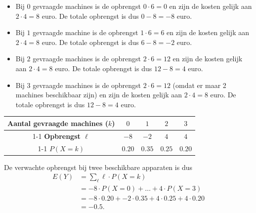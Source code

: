 \begin{enumerate}[label=(\alph*)]
{            \begin{itemize}
                \item Bij $0$ gevraagde machines is de opbrengst $0 \cdot 6=0$ en zijn de kosten gelijk aan $2 \cdot 4=8$ euro.
                De totale opbrengst is dus $0 - 8 = -8$ euro.
                \item Bij $1$ gevraagde machine is de opbrengst $1 \cdot 6=6$ en zijn de kosten gelijk aan $2 \cdot 4=8$ euro.
                De totale opbrengst is dus $6 - 8 = -2$ euro.
                \item Bij $2$ gevraagde machines is de opbrengst $2 \cdot 6=12$ en zijn de kosten gelijk aan $2 \cdot 4=8$ euro.
                De totale opbrengst is dus $12 - 8 = 4$ euro.
                \item Bij $3$ gevraagde machines is de opbrengst $2 \cdot 6=12$ (omdat er maar 2 machines beschikbaar zijn) en zijn de kosten gelijk aan $2 \cdot 4=8$ euro.
                De totale opbrengst is dus $12 - 8 = 4$ euro.
            \end{itemize}
            \begin{center}
                \begin{tabular}{ccccc}
                    \toprule
                        {\bfseries Aantal gevraagde machines ($k$)} & $0$ & $1$ & $2$ & $3$ \\        
                        \cmidrule{1-1} \cmidrule{2-2} \cmidrule{3-3} \cmidrule{4-4} \cmidrule{5-5}
                        {\bfseries Opbrengst $\ell$} & $-8$ & $-2$ & $4$ & $4$ \\        
                        \cmidrule{1-1} \cmidrule{2-2} \cmidrule{3-3} \cmidrule{4-4} \cmidrule{5-5}
                        {\bfseries $P(X=k)$} & $0.20$ & $0.35$ & $0.25$ & $0.20$ \\
                    \bottomrule
                \end{tabular}
            \end{center}
            De verwachte opbrengst bij twee beschikbare apparaten is dus
            \begin{align*}
                E(Y)    &= \sum_\ell \ell \cdot P(X=k) \\
                        &=  -8 \cdot P(X=0) + \ldots + 4 \cdot P(X=3) \\
                        &= -8 \cdot 0.20 + -2 \cdot 0.35 + 4 \cdot 0.25 + 4 \cdot 0.20 \\
                        &= -0.5.
            \end{align*}

}
\end{enumerate}

